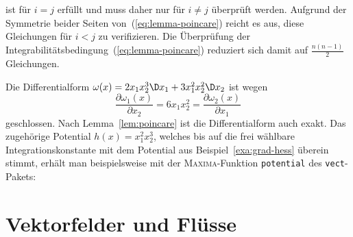 ist für $i=j$ erfüllt und muss daher nur für $i\neq j$ überprüft
werden. Aufgrund der Symmetrie beider Seiten von~(\ref{eq:lemma-poincare})
reicht es aus, diese Gleichungen für $i<j$ zu verifizieren. Die Überprüfung
der Integrabilitätsbedingung~(\ref{eq:lemma-poincare}) reduziert
sich damit auf $\frac{n(n-1)}{2}$ Gleichungen.
\begin{example}
\label{exa:Integration-Differentialform-Poincare}Die Differentialform
$\omega(x)=2x_{1}x_{2}^{3}\D x_{1}+3x_{1}^{2}x_{2}^{2}\D x_{2}$ ist
wegen
\[
\frac{\partial\omega_{1}(x)}{\partial x_{2}}=6x_{1}x_{2}^{2}=\frac{\partial\omega_{2}(x)}{\partial x_{1}}
\]
geschlossen. Nach Lemma~\ref{lem:poincare} ist die Differentialform
auch exakt. Das zugehörige Potential
$h(x)=x_{1}^{2}x_{2}^{3}$, welches bis auf die frei wählbare Integrationskonstante
mit dem Potential aus Beispiel~\ref{exa:grad-hess}
überein stimmt, erhält man beispielsweise mit der \textsc{Maxima}-Funktion
\texttt{potential} des \texttt{vect}-Pakets:


\end{example}
\section{Vektorfelder und Flüsse\label{sec:Vektorfelder-und-Fluesse}}


